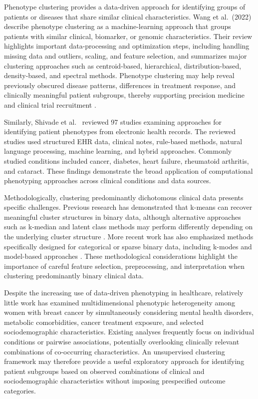 \documentclass[11pt]{article}
\begin{document}
Phenotype clustering provides a data-driven approach for identifying groups of patients or diseases that share similar clinical characteristics. Wang et al.~(2022) describe phenotype clustering as a machine-learning approach that groups patients with similar clinical, biomarker, or genomic characteristics. Their review highlights important data-processing and optimization steps, including handling missing data and outliers, scaling, and feature selection, and summarizes major clustering approaches such as centroid-based, hierarchical, distribution-based, density-based, and spectral methods. Phenotype clustering may help reveal previously obscured disease patterns, differences in treatment response, and clinically meaningful patient subgroups, thereby supporting precision medicine and clinical trial recruitment \cite{Wang2022Phenotype}.

Similarly, Shivade et al.~\cite{Shivade2014} reviewed 97 studies examining approaches for identifying patient phenotypes from electronic health records. The reviewed studies used structured EHR data, clinical notes, rule-based methods, natural language processing, machine learning, and hybrid approaches. Commonly studied conditions included cancer, diabetes, heart failure, rheumatoid arthritis, and cataract. These findings demonstrate the broad application of computational phenotyping approaches across clinical conditions and data sources.

Methodologically, clustering predominantly dichotomous clinical data presents specific challenges. Previous research has demonstrated that k-means can recover meaningful cluster structures in binary data, although alternative approaches such as k-median and latent class methods may perform differently depending on the underlying cluster structure \cite{Brusco2004,Brusco2017}. More recent work has also emphasized methods specifically designed for categorical or sparse binary data, including k-modes and model-based approaches \cite{Dorman2022,Smieja2019}. These methodological considerations highlight the importance of careful feature selection, preprocessing, and interpretation when clustering predominantly binary clinical data.

Despite the increasing use of data-driven phenotyping in healthcare, relatively little work has examined multidimensional phenotypic heterogeneity among women with breast cancer by simultaneously considering mental health disorders, metabolic comorbidities, cancer treatment exposure, and selected sociodemographic characteristics. Existing analyses frequently focus on individual conditions or pairwise associations, potentially overlooking clinically relevant combinations of co-occurring characteristics. An unsupervised clustering framework may therefore provide a useful exploratory approach for identifying patient subgroups based on observed combinations of clinical and sociodemographic characteristics without imposing prespecified outcome categories.
\end{document}
